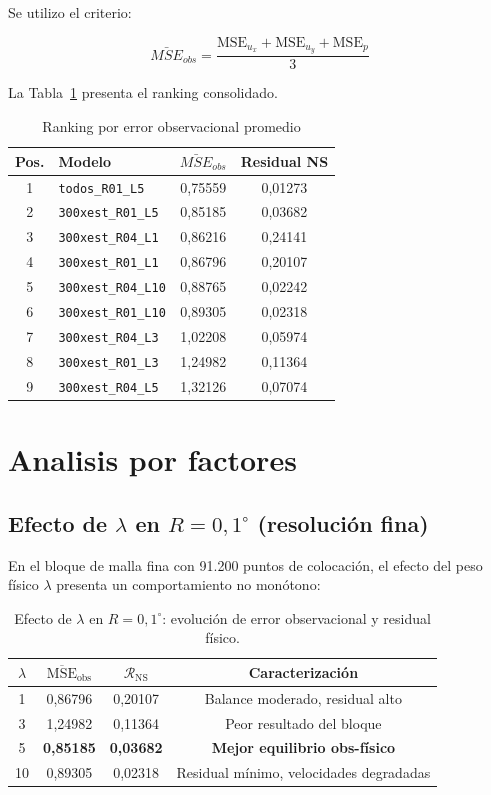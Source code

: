 Se utilizo el criterio:

\[
\bar{MSE}_{obs}=\frac{\text{MSE}_{u_x}+\text{MSE}_{u_y}+\text{MSE}_{p}}{3}
\]

La Tabla~\ref{tab:ranking_obs} presenta el ranking consolidado.

\begin{table}[H]
\centering
\caption{Ranking por error observacional promedio}
\label{tab:ranking_obs}
\begin{tabular}{clcc}
\hline
Pos. & Modelo & $\bar{MSE}_{obs}$ & Residual NS \\
\hline
1 & \texttt{todos\_R01\_L5} & 0,75559 & 0,01273 \\
2 & \texttt{300xest\_R01\_L5} & 0,85185 & 0,03682 \\
3 & \texttt{300xest\_R04\_L1} & 0,86216 & 0,24141 \\
4 & \texttt{300xest\_R01\_L1} & 0,86796 & 0,20107 \\
5 & \texttt{300xest\_R04\_L10} & 0,88765 & 0,02242 \\
6 & \texttt{300xest\_R01\_L10} & 0,89305 & 0,02318 \\
7 & \texttt{300xest\_R04\_L3} & 1,02208 & 0,05974 \\
8 & \texttt{300xest\_R01\_L3} & 1,24982 & 0,11364 \\
9 & \texttt{300xest\_R04\_L5} & 1,32126 & 0,07074 \\
\hline
\end{tabular}
\end{table}

\section{Analisis por factores}

\subsection{Efecto de \texorpdfstring{$\lambda$ en $R=0{,}1^{\circ}$}{lambda en R=0,1 grados} (resolución fina)}

En el bloque de malla fina con 91.200 puntos de colocación, el efecto del peso físico $\lambda$ presenta un comportamiento no monótono:

\begin{table}[H]
\centering
\begin{tabular}{cccc}
\hline
$\lambda$ & $\overline{\text{MSE}}_{\text{obs}}$ & $\mathcal{R}_{\text{NS}}$ & Caracterización \\
\hline
1 & 0,86796 & 0,20107 & Balance moderado, residual alto \\
3 & 1,24982 & 0,11364 & Peor resultado del bloque \\
5 & \textbf{0,85185} & \textbf{0,03682} & \textbf{Mejor equilibrio obs-físico} \\
10 & 0,89305 & 0,02318 & Residual mínimo, velocidades degradadas \\
\hline
\end{tabular}
\caption{Efecto de $\lambda$ en $R=0{,}1^{\circ}$: evolución de error observacional y residual físico.}
\label{tab:lambda_r01}
\end{table}

